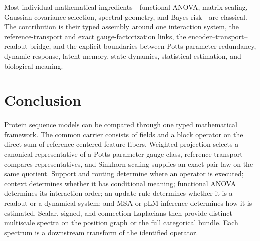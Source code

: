 \documentclass[10pt]{article}
\theoremstyle{definition}
\theoremstyle{remark}
\newcommand{\BookChapter}[1]{\section{#1}}
\begin{document}
Most individual mathematical ingredients---functional ANOVA, matrix scaling, Gaussian covariance
selection, spectral geometry, and Bayes risk---are classical.  The contribution is their typed
assembly around one interaction system, the reference-transport and exact gauge-factorization
links, the encoder--transport--readout bridge, and the explicit boundaries between Potts parameter
redundancy, dynamic response, latent memory, state dynamics, statistical estimation, and biological
meaning.

\BookChapter{Conclusion}

Protein sequence models can be compared through one typed mathematical framework.  The common
carrier consists of fields and a block operator on the direct sum of
reference-centered feature fibers.  Weighted projection selects a canonical representative of a
Potts parameter-gauge class, reference transport compares representatives, and Sinkhorn scaling
supplies an
exact pair law on the same quotient.  Support and routing determine where an operator is executed;
context determines whether it has conditional meaning; functional ANOVA determines its
interaction order; an update rule determines whether it is a readout or a dynamical system; and
MSA or pLM inference determines how it is estimated.  Scalar, signed, and connection Laplacians
then provide distinct multiscale spectra on the position graph or the full categorical bundle.
Each spectrum is a downstream transform of the identified operator.
\end{document}
